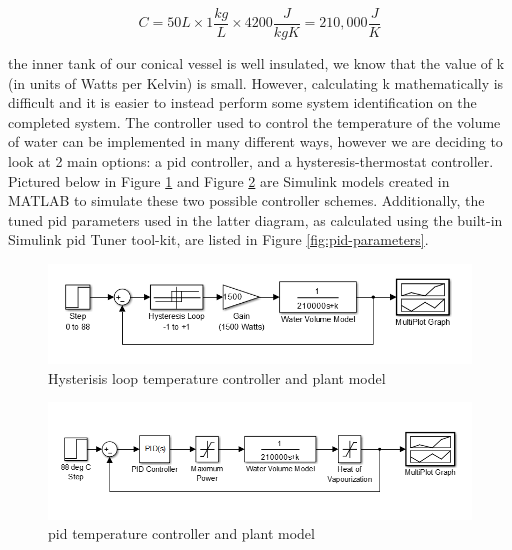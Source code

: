 \documentclass{article}
\begin{document}
\begin{equation}
C = 50L \times 1\frac{kg}{L} \times 4200\frac{J}{kgK} = 210,000\frac{J}{K}
\label{eq:value-heat}
\end{equation}

 the inner tank of our conical vessel is well insulated, we know that the value of k (in units of Watts per Kelvin) is small. However, calculating k mathematically is difficult and it is easier to instead perform some system identification on the completed system.
The controller used to control the temperature of the volume of water can be implemented in many different ways, however we are deciding to look at 2 main options: a \gls{pid} controller, and a hysteresis-thermostat controller. Pictured below in Figure \ref{fig:hysteresis-block-diagram} and Figure \ref{fig:pid-block-diagram} are Simulink models created in MATLAB to simulate these two possible controller schemes. Additionally, the tuned \gls{pid} parameters used in the latter diagram, as calculated using the built-in Simulink \gls{pid} Tuner tool-kit, are listed in Figure \ref{fig:pid-parameters}.

\begin{figure}[H]
\begin{center}
\includegraphics[scale=0.50]{hysteresis-block-diagram.png}
\caption{Hysterisis loop temperature controller and plant model}
\label{fig:hysteresis-block-diagram}
\end{center}
\end{figure}

\begin{figure}[H]
\begin{center}
\includegraphics[scale=0.50]{pid-block-diagram.png}
\caption{\gls{pid} temperature controller and plant model}
\label{fig:pid-block-diagram}
\end{center}
\end{figure}
\end{document}

